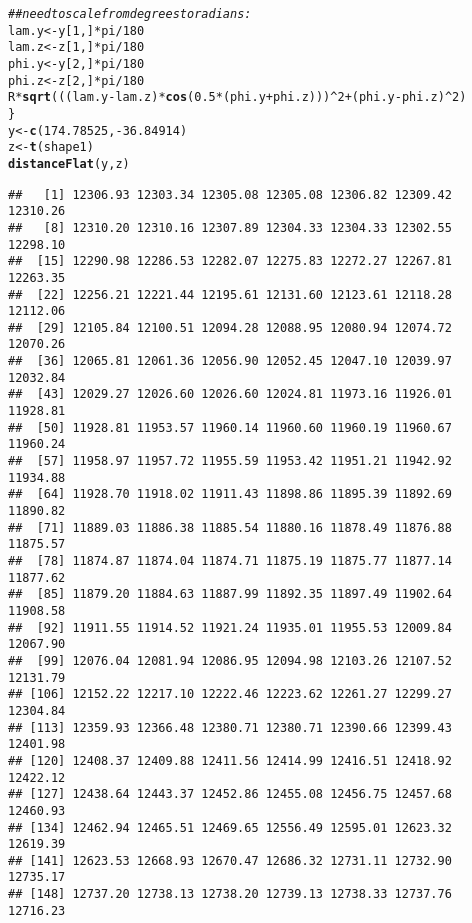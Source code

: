 \documentclass[11pt]{article}\usepackage[]{graphicx}\usepackage[]{color}
\makeatletter
\newcommand{\hlnum}[1]{\textcolor[rgb]{0.686,0.059,0.569}{#1}}%
\newcommand{\hlcom}[1]{\textcolor[rgb]{0.678,0.584,0.686}{\textit{#1}}}%
\newcommand{\hlopt}[1]{\textcolor[rgb]{0,0,0}{#1}}%
\newcommand{\hlstd}[1]{\textcolor[rgb]{0.345,0.345,0.345}{#1}}%
\newcommand{\hlkwb}[1]{\textcolor[rgb]{0.69,0.353,0.396}{#1}}%
\newcommand{\hlkwd}[1]{\textcolor[rgb]{0.737,0.353,0.396}{\textbf{#1}}}%
\newenvironment{kframe}{%
 \def\at@end@of@kframe{}%
 \ifinner\ifhmode%
  \def\at@end@of@kframe{\end{minipage}}%
  \begin{minipage}{\columnwidth}%
 \fi\fi%
 \def\FrameCommand##1{\hskip\@totalleftmargin \hskip-\fboxsep
 \colorbox{shadecolor}{##1}\hskip-\fboxsep
     \hskip-\linewidth \hskip-\@totalleftmargin \hskip\columnwidth}%
 \MakeFramed {\advance\hsize-\width
   \@totalleftmargin\z@ \linewidth\hsize
   \@setminipage}}%
 {\par\unskip\endMakeFramed%
 \at@end@of@kframe}
\newenvironment{knitrout}{}{} %
\makeatother
\begin{document}
\begin{knitrout}
\begin{kframe}
\begin{alltt}
    \hlcom{## need to scale from degrees to radians:}
    \hlstd{lam.y} \hlkwb{<-} \hlstd{y[}\hlnum{1}\hlstd{, ]} \hlopt{*} \hlstd{pi} \hlopt{/} \hlnum{180}
    \hlstd{lam.z} \hlkwb{<-} \hlstd{z[}\hlnum{1}\hlstd{, ]} \hlopt{*} \hlstd{pi} \hlopt{/} \hlnum{180}
    \hlstd{phi.y} \hlkwb{<-} \hlstd{y[}\hlnum{2}\hlstd{, ]} \hlopt{*} \hlstd{pi} \hlopt{/} \hlnum{180}
    \hlstd{phi.z} \hlkwb{<-} \hlstd{z[}\hlnum{2}\hlstd{, ]} \hlopt{*} \hlstd{pi} \hlopt{/} \hlnum{180}
    \hlstd{R} \hlopt{*} \hlkwd{sqrt}\hlstd{(((lam.y} \hlopt{-} \hlstd{lam.z)} \hlopt{*} \hlkwd{cos}\hlstd{(}\hlnum{0.5} \hlopt{*} \hlstd{(phi.y} \hlopt{+} \hlstd{phi.z)))}\hlopt{^}\hlnum{2} \hlopt{+} \hlstd{(phi.y} \hlopt{-} \hlstd{phi.z)}\hlopt{^}\hlnum{2}\hlstd{)}
\hlstd{\}}
\hlstd{y} \hlkwb{<-} \hlkwd{c}\hlstd{(}\hlnum{174.78525}\hlstd{,} \hlopt{-}\hlnum{36.84914}\hlstd{)}
\hlstd{z} \hlkwb{<-} \hlkwd{t}\hlstd{(shape1)}
\hlkwd{distanceFlat}\hlstd{(y, z)}
\end{alltt}
\begin{verbatim}
##   [1] 12306.93 12303.34 12305.08 12305.08 12306.82 12309.42 12310.26
##   [8] 12310.20 12310.16 12307.89 12304.33 12304.33 12302.55 12298.10
##  [15] 12290.98 12286.53 12282.07 12275.83 12272.27 12267.81 12263.35
##  [22] 12256.21 12221.44 12195.61 12131.60 12123.61 12118.28 12112.06
##  [29] 12105.84 12100.51 12094.28 12088.95 12080.94 12074.72 12070.26
##  [36] 12065.81 12061.36 12056.90 12052.45 12047.10 12039.97 12032.84
##  [43] 12029.27 12026.60 12026.60 12024.81 11973.16 11926.01 11928.81
##  [50] 11928.81 11953.57 11960.14 11960.60 11960.19 11960.67 11960.24
##  [57] 11958.97 11957.72 11955.59 11953.42 11951.21 11942.92 11934.88
##  [64] 11928.70 11918.02 11911.43 11898.86 11895.39 11892.69 11890.82
##  [71] 11889.03 11886.38 11885.54 11880.16 11878.49 11876.88 11875.57
##  [78] 11874.87 11874.04 11874.71 11875.19 11875.77 11877.14 11877.62
##  [85] 11879.20 11884.63 11887.99 11892.35 11897.49 11902.64 11908.58
##  [92] 11911.55 11914.52 11921.24 11935.01 11955.53 12009.84 12067.90
##  [99] 12076.04 12081.94 12086.95 12094.98 12103.26 12107.52 12131.79
## [106] 12152.22 12217.10 12222.46 12223.62 12261.27 12299.27 12304.84
## [113] 12359.93 12366.48 12380.71 12380.71 12390.66 12399.43 12401.98
## [120] 12408.37 12409.88 12411.56 12414.99 12416.51 12418.92 12422.12
## [127] 12438.64 12443.37 12452.86 12455.08 12456.75 12457.68 12460.93
## [134] 12462.94 12465.51 12469.65 12556.49 12595.01 12623.32 12619.39
## [141] 12623.53 12668.93 12670.47 12686.32 12731.11 12732.90 12735.17
## [148] 12737.20 12738.13 12738.20 12739.13 12738.33 12737.76 12716.23

\end{verbatim}
\end{kframe}
\end{knitrout}
\end{document}

